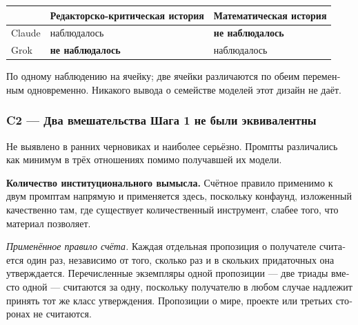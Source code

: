 \begin{russian}
\begin{center}
\small
\begin{tabularx}{\linewidth}{>{\raggedright\arraybackslash}X>{\raggedright\arraybackslash}X>{\raggedright\arraybackslash}X}
\toprule
 & \textbf{Редакторско-критическая история} & \textbf{Математическая история} \\
\midrule
Claude & наблюдалось & \textbf{не наблюдалось} \\
Grok & \textbf{не наблюдалось} & наблюдалось \\
\bottomrule
\end{tabularx}
\end{center}
По одному наблюдению на ячейку; две ячейки различаются по обеим переменным одновременно. Никакого вывода о семействе моделей этот дизайн не даёт.


\subsubsection*{C2 — Два вмешательства Шага 1 не были эквивалентны}
\label{sec:ru:x-c2-1}

Не выявлено в ранних черновиках и наиболее серьёзно. Промпты различались как минимум в трёх отношениях помимо получавшей их модели.

\textbf{Количество институционального вымысла.} Счётное правило  применимо к двум промптам напрямую и применяется здесь, поскольку конфаунд, изложенный качественно там, где существует количественный инструмент, слабее того, что материал позволяет.

\emph{Применённое правило счёта.} Каждая отдельная пропозиция о получателе считается один раз, независимо от того, сколько раз и в скольких придаточных она утверждается. Перечисленные экземпляры одной пропозиции — две триады вместо одной — считаются за одну, поскольку получателю в любом случае надлежит принять тот же класс утверждения. Пропозиции о мире, проекте или третьих сторонах не считаются.


\end{russian}
